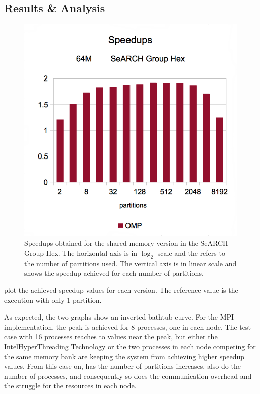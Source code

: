 \documentclass[abstract=on,9pt,twocolumn]{scrartcl}
\begin{document}
\subsection{Results \& Analysis}
\begin{figure}[b]
	\begin{center}
		\includegraphics[width=\columnwidth]{images/hex-speedups-omp.png}
	\end{center}
	\caption{Speedups obtained for the shared memory version in the SeARCH Group Hex. The horizontal axis is in $\log_{2}$ scale and the refers to the number of partitions used. The vertical axis is in linear scale and shows the speedup achieved for each number of partitions.}
	\label{fig:omp}
\end{figure}

 plot the achieved speedup values for each version. The reference value is the execution with only 1 partition.

As expected, the two graphs show an inverted bathtub curve. For the MPI implementation, the peak is achieved for 8 processes, one in each node. The test case with 16 processes reaches to values near the peak, but either the Intel\textregistered HyperThreading Technology or the two processes in each node competing for the same memory bank are keeping the system from achieving higher speedup values. From this case on, has the number of partitions increases, also do the number of processes, and consequently so does the communication overhead and the struggle for the resources in each node.
\end{document}
